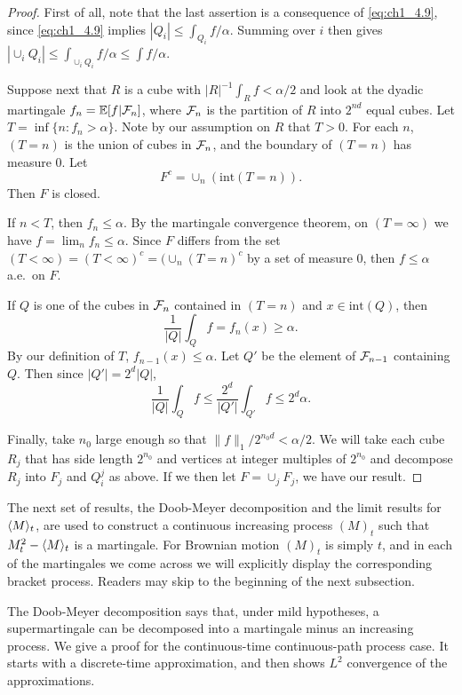 \begin{proof}
First of all, note that the last assertion is a consequence of \eqref{eq:ch1_4.9}, since \eqref{eq:ch1_4.9} implies $|Q_i| \leq \int_{Q_i} f/\alpha$. Summing over $i$ then gives $|\cup_i Q_i|\leq \int_{\cup_i Q_i} f/\alpha \leq \int f/\alpha$.

Suppose next that $R$ is a cube with $|R|^{-1}\int_R f < \alpha/2$ and look at the dyadic martingale $f_n = \mathbb{E}[f| \mathcal{F}_n]$, where $\mathcal{F}_n$ is the partition of $R$ into $2^{nd}$ equal cubes. Let $T = \inf\{n : f_n > \alpha\}$. Note by our assumption on $R$ that $T > 0$. For each $n$, $(T = n)$ is the union of cubes in $\mathcal{F}_n$, and the boundary of $(T = n)$ has measure $0$. Let
\[
    F^c = \cup_n(\text{int}(T = n)).
\]
Then $F$ is closed.

If $n < T$, then $f_n \leq \alpha$. By the martingale convergence theorem, on  $(T = \infty)$ we have $f = \lim_n f_n \leq \alpha$. Since $F$ differs from the set $(T < \infty) \allowbreak = (T < \infty)^c=(\cup_n(T=n)^c$ by a set of measure $0$, then $f \leq \alpha$ a.e.\ on $F$.

If $Q$ is one of the cubes in $\mathcal{F}_n$ contained in $(T = n)$ and $x \in \text{int}(Q)$, then
\[
    \frac{1}{|Q|}\int_Q f = f_n(x) \geq \alpha.
\]
By our definition of $T$, $f_{n-1}(x) \leq \alpha$. Let $Q'$ be the element of $\mathcal{F}_{n-1}$ containing $Q$. Then since $|Q'| = 2^d|Q|$,
\[
    \frac{1}{|Q|}\int_Q f \leq \frac{2^d}{|Q'|}\int_{Q'} f \leq 2^d\alpha.
\]

Finally, take $n_0$ large enough so that $\|f\|_1/2^{n_0d} < \alpha/2$. We will take each cube $R_j$ that has side length $2^{n_0}$ and vertices at integer multiples of $2^{n_0}$ and decompose $R_j$ into $F_j$ and $Q_i^j$ as above. If we then let $F = \cup_j F_j$, we have our result.
\end{proof}


The next set of results, the Doob-Meyer decomposition and the limit results for $\langle M \rangle_t$, are used to construct a continuous increasing process $(M)_t$ such that $M_t^2 - \langle M \rangle_t$ is a martingale. For Brownian motion $(M)_t$ is simply $t$, and in each of the martingales we come across we will explicitly display the corresponding bracket process. Readers may skip to the beginning of the next subsection.

The Doob-Meyer decomposition says that, under mild hypotheses, a supermartingale can be decomposed into a martingale minus an increasing process. We give a proof for the continuous-time continuous-path process case. It starts with a discrete-time approximation, and then shows $L^2$ convergence of the approximations.

